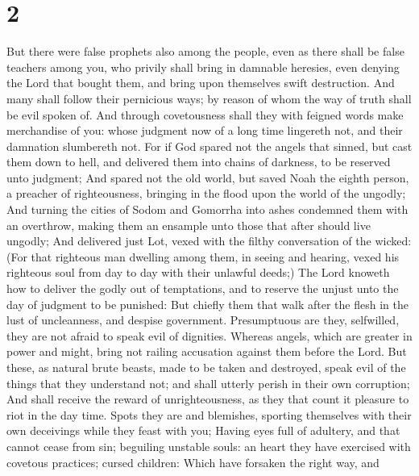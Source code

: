 \hypertarget{section-1}{%
\section{2}\label{section-1}}

 But there were false prophets also among the people, even
as there shall be false teachers among you, who privily shall bring in
damnable heresies, even denying the Lord that bought them, and bring
upon themselves swift destruction.  And many shall follow
their pernicious ways; by reason of whom the way of truth shall be evil
spoken of.  And through covetousness shall they with
feigned words make merchandise of you: whose judgment now of a long time
lingereth not, and their damnation slumbereth not.  For if
God spared not the angels that sinned, but cast them down to hell, and
delivered them into chains of darkness, to be reserved unto judgment;
 And spared not the old world, but saved Noah the eighth
person, a preacher of righteousness, bringing in the flood upon the
world of the ungodly;  And turning the cities of Sodom and
Gomorrha into ashes condemned them with an overthrow, making them an
ensample unto those that after should live ungodly;  And
delivered just Lot, vexed with the filthy conversation of the wicked:
 (For that righteous man dwelling among them, in seeing
and hearing, vexed his righteous soul from day to day with their
unlawful deeds;)  The Lord knoweth how to deliver the
godly out of temptations, and to reserve the unjust unto the day of
judgment to be punished:  But chiefly them that walk
after the flesh in the lust of uncleanness, and despise government.
Presumptuous are they, selfwilled, they are not afraid to speak evil of
dignities.  Whereas angels, which are greater in power
and might, bring not railing accusation against them before the Lord.
 But these, as natural brute beasts, made to be taken and
destroyed, speak evil of the things that they understand not; and shall
utterly perish in their own corruption;  And shall
receive the reward of unrighteousness, as they that count it pleasure to
riot in the day time. Spots they are and blemishes, sporting themselves
with their own deceivings while they feast with you; 
Having eyes full of adultery, and that cannot cease from sin; beguiling
unstable souls: an heart they have exercised with covetous practices;
cursed children:  Which have forsaken the right way, and
